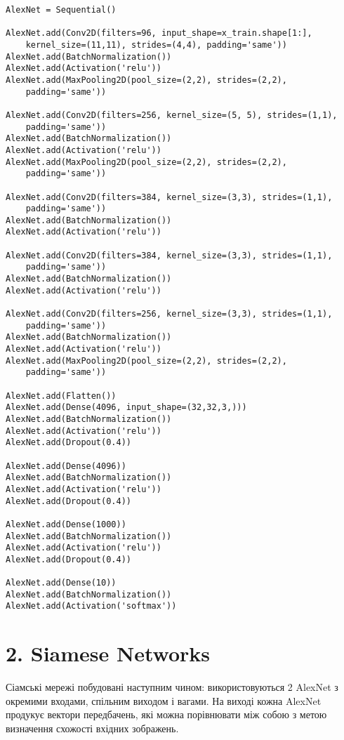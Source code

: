 \documentclass{/home/alx/Documents/LaTex/nulp}
\begin{document}
\begin{verbatim}
AlexNet = Sequential()

AlexNet.add(Conv2D(filters=96, input_shape=x_train.shape[1:],
    kernel_size=(11,11), strides=(4,4), padding='same'))
AlexNet.add(BatchNormalization())
AlexNet.add(Activation('relu'))
AlexNet.add(MaxPooling2D(pool_size=(2,2), strides=(2,2),
    padding='same'))

AlexNet.add(Conv2D(filters=256, kernel_size=(5, 5), strides=(1,1),
    padding='same'))
AlexNet.add(BatchNormalization())
AlexNet.add(Activation('relu'))
AlexNet.add(MaxPooling2D(pool_size=(2,2), strides=(2,2),
    padding='same'))

AlexNet.add(Conv2D(filters=384, kernel_size=(3,3), strides=(1,1),
    padding='same'))
AlexNet.add(BatchNormalization())
AlexNet.add(Activation('relu'))

AlexNet.add(Conv2D(filters=384, kernel_size=(3,3), strides=(1,1),
    padding='same'))
AlexNet.add(BatchNormalization())
AlexNet.add(Activation('relu'))

AlexNet.add(Conv2D(filters=256, kernel_size=(3,3), strides=(1,1),
    padding='same'))
AlexNet.add(BatchNormalization())
AlexNet.add(Activation('relu'))
AlexNet.add(MaxPooling2D(pool_size=(2,2), strides=(2,2),
    padding='same'))

AlexNet.add(Flatten())
AlexNet.add(Dense(4096, input_shape=(32,32,3,)))
AlexNet.add(BatchNormalization())
AlexNet.add(Activation('relu'))
AlexNet.add(Dropout(0.4))

AlexNet.add(Dense(4096))
AlexNet.add(BatchNormalization())
AlexNet.add(Activation('relu'))
AlexNet.add(Dropout(0.4))

AlexNet.add(Dense(1000))
AlexNet.add(BatchNormalization())
AlexNet.add(Activation('relu'))
AlexNet.add(Dropout(0.4))

AlexNet.add(Dense(10))
AlexNet.add(BatchNormalization())
AlexNet.add(Activation('softmax'))
\end{verbatim}

\section*{2. Siamese Networks}

Сіамські мережі побудовані наступним чином: використовуються 2 AlexNet з окремими входами, спільним виходом і вагами. На виході кожна AlexNet продукує вектори передбачень, які можна порівнювати між собою з метою визначення схожості вхідних зображень.
\end{document}
